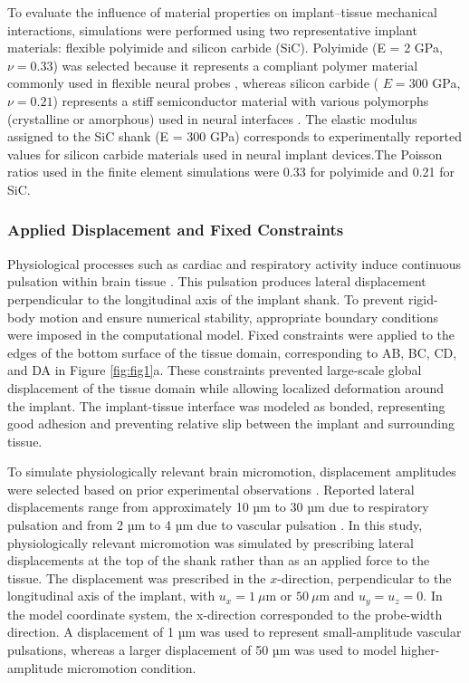 \documentclass[fleqn,10pt]{wlscirep}
\begin{document}
To evaluate the influence of material properties on implant--tissue mechanical interactions, simulations were performed using two representative implant materials: flexible polyimide and silicon carbide (SiC). Polyimide (E = 2 GPa, $\nu = 0.33$) was selected because it represents a compliant polymer material commonly used in flexible neural probes \cite{AlAbed2022, Pimenta2024, Cheung2007, vanDaal2020, Freitas2022, Pimenta2021, Vomero2022, Tintelott2022, Sperry2018}, whereas silicon carbide ( $E = 300$ GPa, $\nu = 0.21$) represents a stiff semiconductor material with various polymorphs (crystalline or amorphous) used in neural interfaces \cite{Deku2018, Knaack2016, Bernardin2018, DiazBotia2017, Beygi2019, Abbott2024, Geramifard2024, Hsu2007, Nguyen2025, Frewin2025, Haghighi2025}. The elastic modulus assigned to the SiC shank (E = 300 GPa) corresponds to experimentally reported values for silicon carbide materials used in neural implant devices.The Poisson ratios used in the finite element simulations were 0.33 for polyimide and 0.21 for SiC.



\subsubsection{Applied Displacement and Fixed Constraints}

Physiological processes such as cardiac and respiratory activity induce continuous pulsation within brain tissue \cite{Polanco2014, Duncan2021, Gilletti2006}. This pulsation produces lateral displacement perpendicular to the longitudinal axis of the implant shank. To prevent rigid-body motion and ensure numerical stability, appropriate boundary conditions were imposed in the computational model. Fixed constraints were applied to the edges of the bottom surface of the tissue domain, corresponding to AB, BC, CD, and DA in Figure \ref{fig:fig1}a. These constraints prevented large-scale global displacement of the tissue domain while allowing localized deformation around the implant. The implant-tissue interface was modeled as bonded, representing good adhesion and preventing relative slip between the implant and surrounding tissue.

To simulate physiologically relevant brain micromotion, displacement amplitudes were selected based on prior experimental observations \cite{Subbaroyan2005}. Reported lateral displacements range from approximately 10 µm to 30 µm due to respiratory pulsation and from 2 µm to 4 µm due to vascular pulsation \cite{Duncan2021, Gilletti2006}. In this study, physiologically relevant micromotion was simulated by prescribing lateral displacements at the top of the shank rather than as an applied force to the tissue. The displacement was prescribed in the $x$-direction, perpendicular to the longitudinal axis of the implant, with $u_x = 1~\mu$m or $50~\mu$m and $u_y = u_z = 0$. In the model coordinate system, the x-direction corresponded to the probe-width direction. A displacement of 1 µm was used to represent small-amplitude vascular pulsations, whereas a larger displacement of 50 µm was used to model higher-amplitude micromotion condition.
\end{document}
